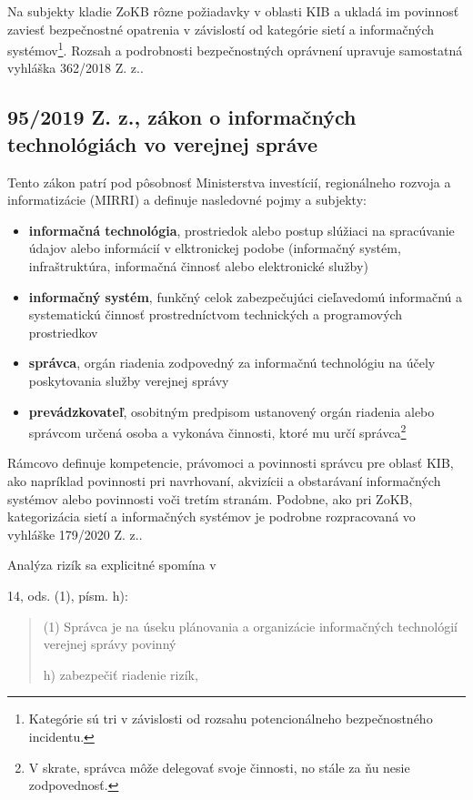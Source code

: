 Na subjekty kladie ZoKB rôzne požiadavky v oblasti KIB a ukladá im povinnosť zaviesť bezpečnostné opatrenia v závislostí od kategórie sietí a informačných
systémov\footnote{Kategórie sú tri v závislosti od rozsahu potencionálneho bezpečnostného incidentu.}. Rozsah a podrobnosti bezpečnostných oprávnení
upravuje samostatná vyhláška 362/2018 Z. z.\cite{sk_362_2018}.

\subsection*{95/2019 Z. z., zákon o informačných technológiách vo verejnej správe}
Tento zákon patrí pod pôsobnosť Ministerstva investícií, regionálneho rozvoja a informatizácie (MIRRI) a definuje nasledovné pojmy a subjekty:
\begin{itemize}
    \item \textbf{informačná technológia}, prostriedok alebo postup slúžiaci na spracúvanie údajov alebo informácií v elktronickej podobe (informačný systém,
    infraštruktúra, informačná činnosť alebo elektronické služby) 
    \item \textbf{informačný systém}, funkčný celok zabezpečujúci cieľavedomú informačnú a systematickú činnosť prostredníctvom technických a programových prostriedkov
    \item \textbf{správca}, orgán riadenia zodpovedný za informačnú technológiu na účely poskytovania služby verejnej správy
    \item \textbf{prevádzkovateľ}, osobitným predpisom ustanovený orgán riadenia alebo správcom určená osoba a vykonáva činnosti, ktoré mu určí správca\footnote{V skrate,
    správca môže delegovať svoje činnosti, no stále za ňu nesie zodpovednosť.}
\end{itemize}
Rámcovo definuje kompetencie, právomoci a povinnosti správcu pre oblasť KIB, ako napríklad povinnosti pri navrhovaní, akvizícii a obstarávaní informačných systémov alebo
povinnosti voči tretím stranám. Podobne, ako pri ZoKB, kategorizácia sietí a informačných systémov je podrobne rozpracovaná vo vyhláške 179/2020 Z. z.\cite{sk_179_2020}.

Analýza rizík sa explicitné spomína v \par14, ods. (1), písm. h):
\begin{quote}
(1) Správca je na úseku plánovania a organizácie informačných technológií verejnej správy povinný 

\hspace{3em}h) zabezpečiť riadenie rizík,
\end{quote}

